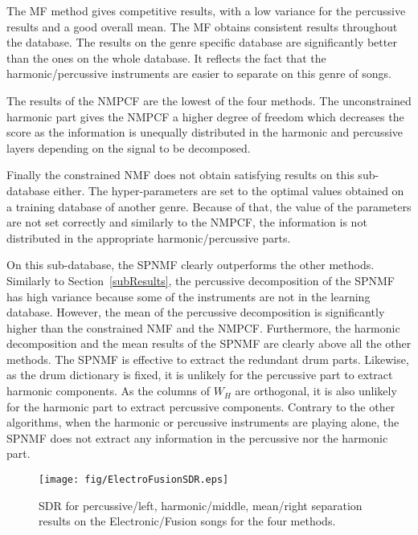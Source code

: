 The MF method gives competitive results, with a low variance for the percussive results and a good overall mean. The MF obtains consistent results throughout the database. The results on the genre specific database are significantly better than the ones on the whole database. It reflects the fact that the harmonic/percussive instruments are easier to separate on this genre of songs. 
 
The results of the NMPCF are the lowest of the four methods. The unconstrained harmonic part gives the NMPCF a higher degree of freedom which decreases the score as the information is unequally distributed in the harmonic and percussive layers depending on the signal to be decomposed. 

Finally the constrained NMF does not obtain satisfying results on this sub-database either. The hyper-parameters are set to the optimal values obtained on a training database of another genre. Because of that, the value of the parameters are not set correctly and similarly to the NMPCF, the information is not distributed in the appropriate harmonic/percussive parts. 


On this sub-database, the SPNMF clearly outperforms the other methods. Similarly to Section~\ref{subResults}, the percussive decomposition of the SPNMF has high variance because some of the instruments are not in the learning database. However, the mean of the percussive decomposition is significantly higher than the constrained NMF and the NMPCF. Furthermore, the harmonic decomposition and the mean results of the SPNMF are clearly above all the other methods. The SPNMF is effective to extract the redundant drum parts. Likewise, as the drum dictionary is fixed, it is unlikely for the percussive part to extract harmonic components. As the columns of $W_{H}$ are orthogonal, it is also unlikely for the harmonic part to extract percussive components. Contrary to the other algorithms, when the harmonic or percussive instruments are playing alone, the SPNMF does not extract any information in the percussive nor the harmonic part.



\begin{figure}[htb]

  \centering 
  \texttt{[image: fig/ElectroFusionSDR.eps]}
  \caption{\label{ElectroFusionSDR} SDR for percussive/left, harmonic/middle, mean/right separation results on the Electronic/Fusion songs for the four methods.}
  
\end{figure}

